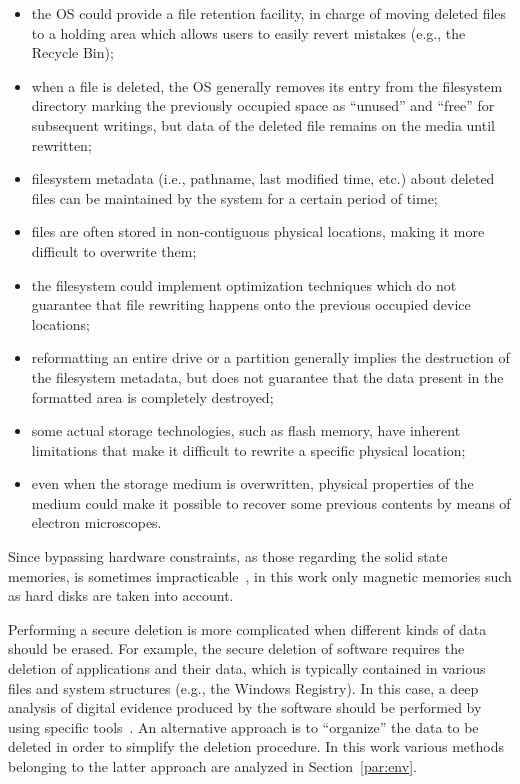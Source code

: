 \documentclass[conference]{IEEEtran}
\begin{document}
\begin{itemize}
 \item the OS could provide a file retention facility, in charge of moving deleted files to a holding area which allows users to easily revert mistakes (e.g., the Recycle Bin);
 \item when a file is deleted, the OS generally removes its entry from the filesystem directory marking the previously occupied space as ``unused'' and ``free'' for subsequent writings, but data of the deleted file remains on the media until rewritten;
 \item filesystem metadata (i.e., pathname, last modified time, etc.) about deleted files can be maintained by the system for a certain period of time;
 \item files are often stored in non-contiguous physical locations, making it more difficult to overwrite them;
 \item the filesystem could implement optimization techniques which do not guarantee that file rewriting happens onto the previous occupied device locations;
 \item reformatting an entire drive or a partition generally implies the destruction of the filesystem metadata, but does not guarantee that the data present in the formatted area is completely destroyed;
 \item some actual storage technologies, such as flash memory, have inherent limitations that make it difficult to rewrite a specific physical location;
 \item even when the storage medium is overwritten, physical properties of the medium could make it possible to recover some previous contents by means of electron microscopes.
\end{itemize}

Since bypassing hardware constraints, as those regarding the solid state memories, is sometimes impracticable~\cite{solid}, in this work only magnetic memories such as hard disks are taken into account.

Performing a secure deletion is more complicated when different kinds of data should be erased. For example, the secure deletion of software requires the deletion of applications and their data, which is typically contained in various files and system structures (e.g., the Windows Registry). In this case, a deep analysis of digital evidence produced by the software should be performed by using specific tools~\cite{autoalibi}. An alternative approach is to ``organize'' the data to be deleted in order to simplify the deletion procedure. In this work various methods belonging to the latter approach are analyzed in Section~\ref{par:env}.
\end{document}
